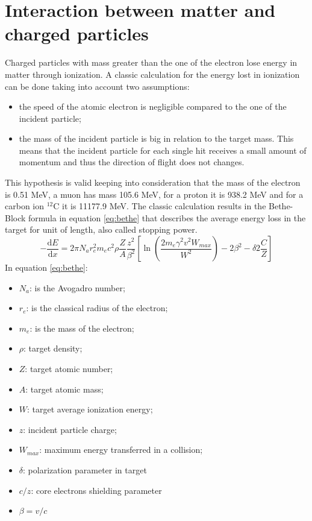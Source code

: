 \section{Interaction between matter and charged particles}
Charged particles with mass greater than the one of the electron lose energy in matter through ionization.
A classic calculation for the energy lost in ionization can be done taking into account two assumptions:
\begin{itemize}
	\item the speed of the atomic electron is negligible compared to the one of the incident particle;
	\item the mass of the incident particle is big in relation to the target mass. This means that the incident particle for each single hit receives a small amount of momentum and thus the direction of flight does not changes.  
\end{itemize}
\noindent This hypothesis is valid keeping into consideration that the mass of the electron is 0.51 MeV, a muon has mass 105.6 MeV, for a proton it is 938.2 MeV and for a carbon ion ${}^{12}$C it is 11177.9 MeV.
\newline
The classic calculation results in the Bethe-Block formula in equation \ref{eq:bethe} that describes the average energy loss in the target for unit of length, also called stopping power.
\begin{equation}\label{eq:bethe}
	-\dfrac{\mathrm dE}{\mathrm dx} = 2 \pi N_{a} r_{e}^{2} m_{e} c^{2} \rho \dfrac{Z}{A}  \dfrac{z^{2}}{\beta^{2}}\left[\ln\left(\dfrac{2m_{e} \gamma ^{2} v^{2} W_{max}}{W^{2}}\right) - 2\beta^{2} - \delta 2\frac{C}{Z}\right]
\end{equation}
\noindent In equation \ref{eq:bethe}:
\begin{itemize}
	\item $N_a$: is the Avogadro number;
	\item $r_e$: is the classical radius of the electron;
	\item $m_e$: is the mass of the electron;
	\item $\rho$: target density;
	\item $Z $: target atomic number;
	\item $A $: target atomic mass;
	\item $W $: target average ionization energy;
	\item $z $: incident particle charge;
	\item $W_{max} $: maximum energy transferred in a collision; 
	\item $\delta $: polarization parameter in target
	\item $c/z $: core electrons shielding parameter 
	\item $\beta = v/c $
\end{itemize}
